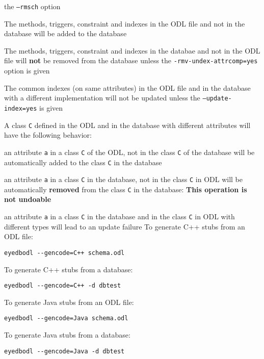 the \texttt{--rmsch} option
\item The methods, triggers, constraint and indexes
in the ODL file and not in the database will be added to the database
\item The methods, triggers, constraint and indexes in the databae
and not in the ODL file will {\bf not} be removed from the database
unless the \texttt{-rmv-undex-attrcomp=yes} option is given
\item The common indexes (on same attributes) in the ODL file and in the
database with a different implementation will not be updated unless
the \texttt{--update-index=yes} is given
\item A class \texttt{C} defined in the ODL and in the database with
different attributes will have the following behavior:
\bi
\item an attribute \texttt{a} in a class \texttt{C} of the ODL, not
in the class \texttt{C} of the database will be automatically added to the
class \texttt{C} in the database
\item an attribute \texttt{a} in a class \texttt{C} in the database, not
in the class \texttt{C} in ODL will be automatically {\bf removed} from
the class \texttt{C} in the database: {\bf This operation is not undoable}
\item an attribute \texttt{a} in a class \texttt{C} in the database and
in the class \texttt{C} in ODL with different types will lead
to an update failure
\ei
\ei
{}
To generate C++ stubs from an ODL file:
\vspace{-2mm}
\begin{verbatim}
eyedbodl --gencode=C++ schema.odl
\end{verbatim}
To generate C++ stubs from a database:
\vspace{-2mm}
\begin{verbatim}
eyedbodl --gencode=C++ -d dbtest
\end{verbatim}


To generate Java stubs from an ODL file:
\vspace{-2mm}
\begin{verbatim}
eyedbodl --gencode=Java schema.odl
\end{verbatim}
To generate Java stubs from a database:
\vspace{-2mm}
\begin{verbatim}
eyedbodl --gencode=Java -d dbtest
\end{verbatim}

